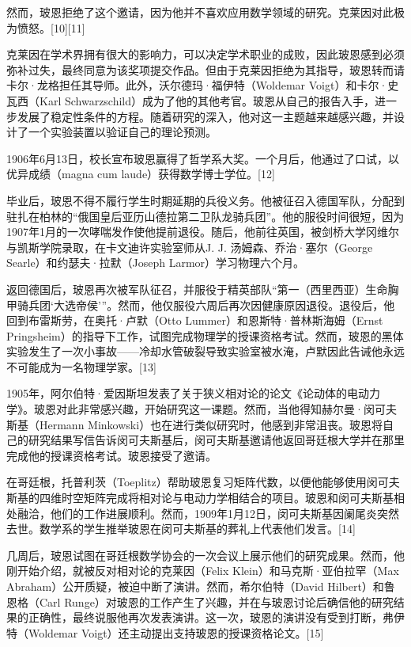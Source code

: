 然而，玻恩拒绝了这个邀请，因为他并不喜欢应用数学领域的研究。克莱因对此极为愤怒。[10][11]

克莱因在学术界拥有很大的影响力，可以决定学术职业的成败，因此玻恩感到必须弥补过失，最终同意为该奖项提交作品。但由于克莱因拒绝为其指导，玻恩转而请卡尔·龙格担任其导师。此外，沃尔德玛·福伊特（Woldemar Voigt）和卡尔·史瓦西（Karl Schwarzschild）成为了他的其他考官。玻恩从自己的报告入手，进一步发展了稳定性条件的方程。随着研究的深入，他对这一主题越来越感兴趣，并设计了一个实验装置以验证自己的理论预测。

1906年6月13日，校长宣布玻恩赢得了哲学系大奖。一个月后，他通过了口试，以优异成绩（magna cum laude）获得数学博士学位。[12]

毕业后，玻恩不得不履行学生时期延期的兵役义务。他被征召入德国军队，分配到驻扎在柏林的“俄国皇后亚历山德拉第二卫队龙骑兵团”。他的服役时间很短，因为1907年1月的一次哮喘发作使他提前退役。随后，他前往英国，被剑桥大学冈维尔与凯斯学院录取，在卡文迪许实验室师从J. J. 汤姆森、乔治·塞尔（George Searle）和约瑟夫·拉默（Joseph Larmor）学习物理六个月。

返回德国后，玻恩再次被军队征召，并服役于精英部队“第一（西里西亚）生命胸甲骑兵团‘大选帝侯’”。然而，他仅服役六周后再次因健康原因退役。退役后，他回到布雷斯劳，在奥托·卢默（Otto Lummer）和恩斯特·普林斯海姆（Ernst Pringsheim）的指导下工作，试图完成物理学的授课资格考试。然而，玻恩的黑体实验发生了一次小事故——冷却水管破裂导致实验室被水淹，卢默因此告诫他永远不可能成为一名物理学家。[13]

1905年，阿尔伯特·爱因斯坦发表了关于狭义相对论的论文《论动体的电动力学》。玻恩对此非常感兴趣，开始研究这一课题。然而，当他得知赫尔曼·闵可夫斯基（Hermann Minkowski）也在进行类似研究时，他感到非常沮丧。玻恩将自己的研究结果写信告诉闵可夫斯基后，闵可夫斯基邀请他返回哥廷根大学并在那里完成他的授课资格考试。玻恩接受了邀请。

在哥廷根，托普利茨（Toeplitz）帮助玻恩复习矩阵代数，以便他能够使用闵可夫斯基的四维时空矩阵完成将相对论与电动力学相结合的项目。玻恩和闵可夫斯基相处融洽，他们的工作进展顺利。然而，1909年1月12日，闵可夫斯基因阑尾炎突然去世。数学系的学生推举玻恩在闵可夫斯基的葬礼上代表他们发言。[14]

几周后，玻恩试图在哥廷根数学协会的一次会议上展示他们的研究成果。然而，他刚开始介绍，就被反对相对论的克莱因（Felix Klein）和马克斯·亚伯拉罕（Max Abraham）公开质疑，被迫中断了演讲。然而，希尔伯特（David Hilbert）和鲁恩格（Carl Runge）对玻恩的工作产生了兴趣，并在与玻恩讨论后确信他的研究结果的正确性，最终说服他再次发表演讲。这一次，玻恩的演讲没有受到打断，弗伊特（Woldemar Voigt）还主动提出支持玻恩的授课资格论文。[15] 

